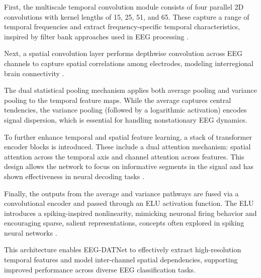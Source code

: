 \documentclass[pdflatex,sn-mathphys-num]{sn-jnl}%
\theoremstyle{thmstyleone}%
\theoremstyle{thmstyletwo}%
\theoremstyle{thmstylethree}%
\begin{document}
First, the multiscale temporal convolution module consists of four parallel 2D convolutions with kernel lengths of 15, 25, 51, and 65. These capture a range of temporal frequencies and extract frequency-specific temporal characteristics, inspired by filter bank approaches used in EEG processing \cite{schirrmeister2017deep}.

Next, a spatial convolution layer performs depthwise convolution across EEG channels to capture spatial correlations among electrodes, modeling interregional brain connectivity \cite{lawhern2018eegnet}.

The dual statistical pooling mechanism applies both average pooling and variance pooling to the temporal feature maps. While the average captures central tendencies, the variance pooling (followed by a logarithmic activation) encodes signal dispersion, which is essential for handling nonstationary EEG dynamics.

To further enhance temporal and spatial feature learning, a stack of transformer encoder blocks is introduced. These include a dual attention mechanism: spatial attention across the temporal axis and channel attention across features. This design allows the network to focus on informative segments in the signal and has shown effectiveness in neural decoding tasks \cite{vaswani2017attention, xu2022transformer}.

Finally, the outputs from the average and variance pathways are fused via a convolutional encoder and passed through an ELU activation function. The ELU introduces a spiking-inspired nonlinearity, mimicking neuronal firing behavior and encouraging sparse, salient representations, concepts often explored in spiking neural networks \cite{gerstner2014neuronal}.

This architecture enables EEG-DATNet to effectively extract high-resolution temporal features and model inter-channel spatial dependencies, supporting improved performance across diverse EEG classification tasks.
\end{document}
